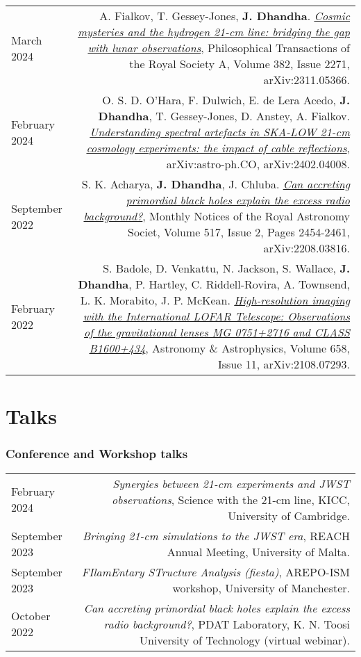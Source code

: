 \documentclass{article}
\begin{document}
\begin{tabular}{L!{\vrule}R}

    March 2024 & A. Fialkov, T. Gessey-Jones, \textbf{J. Dhandha}. \href{https://doi.org/10.1098/rsta.2023.0068}{\textit{Cosmic mysteries and the hydrogen 21-cm line: bridging the gap with lunar observations}}, Philosophical Transactions of the Royal Society A, Volume 382, Issue 2271, arXiv:2311.05366. \\

    February 2024 & O. S. D. O'Hara, F. Dulwich, E. de Lera Acedo, \textbf{J. Dhandha}, T. Gessey-Jones, D. Anstey, A. Fialkov. \href{https://arxiv.org/abs/2402.04008}{\textit{Understanding spectral artefacts in SKA-LOW 21-cm cosmology experiments: the impact of cable reflections}}, arXiv:astro-ph.CO, arXiv:2402.04008. \\

	  September 2022 & S. K. Acharya, \textbf{J. Dhandha}, J. Chluba. \href{https://doi.org/10.1093/mnras/stac2739}{\textit{Can accreting primordial black holes explain the excess radio background?}}, Monthly Notices of the Royal Astronomy Societ, Volume 517, Issue 2, Pages 2454-2461, arXiv:2208.03816. \\

	  February 2022 & S. Badole, D. Venkattu, N. Jackson, S. Wallace, \textbf{J. Dhandha}, P. Hartley, C. Riddell-Rovira, A. Townsend, L. K. Morabito, J. P. McKean. \href{https://doi.org/10.1051/0004-6361/202141227}{\textit{High-resolution imaging with the International LOFAR Telescope: Observations of the gravitational lenses MG 0751+2716 and CLASS B1600+434}}, Astronomy \& Astrophysics, Volume 658, Issue 11, arXiv:2108.07293. \\

\end{tabular}

\section*{Talks}
\subsubsection*{Conference and Workshop talks}
\begin{tabular}{L!{\vrule}R}

    February 2024 & \textit{Synergies between 21-cm experiments and JWST observations}, Science with the 21-cm line, KICC, University of Cambridge. \\

    September 2023 & \textit{Bringing 21-cm simulations to the JWST era}, REACH Annual Meeting, University of Malta. \\

    September 2023 & \textit{FIlamEntary STructure Analysis (fiesta)}, AREPO-ISM workshop, University of Manchester. \\

    October 2022 & \textit{Can accreting primordial black holes explain the excess radio background?}, PDAT Laboratory, K. N. Toosi University of Technology (virtual webinar). \\

\end{tabular}
\end{document}

